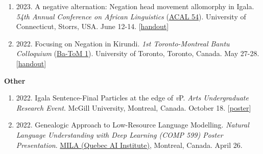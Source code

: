 \documentclass[margin,line]{resume}
\begin{document}
\begin{resume}
\begin{enumerate}[-, leftmargin=1em, topsep=2pt]
		\item[] {2023. A negative alternation: Negation head movement allomorphy in Igala. {\it 54th Annual Conference on African Linguistics} (\href{https://uconnuecs.cventevents.com/event/aef2d257-6a6a-41b5-b83d-2c6efc60aac5/summary}{ACAL 54}). University of Connecticut, Storrs, USA. June 12-14. [\href{run:../handouts/chaperon_ACAL54_Igala_Negation-handout.pdf}{handout}]}
		
		\item[] {2022. Focusing on Negation in Kirundi. {\it 1st Toronto-Montreal Bantu Colloquium} (\href{https://mcling.blogs.mcgill.ca/2022/05/24/mcgill-at-ba-tom-1/}{Ba-ToM 1}). University of Toronto, Toronto, Canada. May 27-28. [\href{run:../handouts/chaperon_batom_kirundi_negn-handout.pdf}{handout}]}
	\end{enumerate}
	

	\textbf{Other}
	\begin{enumerate}[-, leftmargin=1em, topsep=2pt]
		\item[] {2022. Igala Sentence-Final Particles at the edge of \textit{v}P. {\it Arts Undergraduate Research Event}. McGill University, Montreal, Canada. October 18. [\href{https://www.mcgill.ca/arts-internships/files/arts-internships/brandon_chaperon.pdf}{poster}]}

		\item[] {2022. Genealogic Approach to Low-Resource Language Modelling. {\it Natural Language Understanding with Deep Learning (COMP 599) Poster Presentation}. \href{https://mila.quebec/en/}{MILA (Quebec AI Institute)}, Montreal, Canada. April 26.}

	\end{enumerate}



\end{resume}
\end{document}
